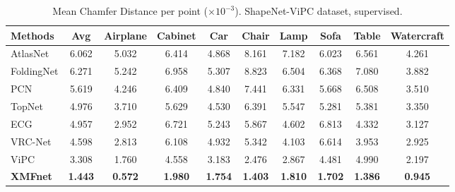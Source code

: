 \documentclass{article}
\begin{document}
\begin{table}
  \caption{Mean Chamfer Distance per point ($\times 10^{-3}$). ShapeNet-ViPC dataset, supervised.}
  \setlength\tabcolsep{4.4pt}
  \label{sup-res}
  \centering
  \begin{tabular}{lccccccccc}
\cmidrule(r){1-10}
    Methods & Avg & Airplane & Cabinet & Car & Chair & Lamp & Sofa & Table & Watercraft \\
    \midrule
    \midrule
    AtlasNet \cite{atlas} & 6.062 & 5.032 & 6.414 & 4.868 & 8.161 & 7.182 & 6.023 & 6.561 & 4.261      \\
    FoldingNet \cite{folding}  &  6.271  & 5.242 & 6.958 & 5.307 & 8.823 & 6.504 & 6.368 & 7.080 & 3.882   \\
    PCN \cite{pcn}& 5.619 & 4.246 & 6.409 & 4.840 & 7.441 & 6.331 & 5.668 & 6.508 & 3.510 \\  
    TopNet \cite{topnet}  & 4.976 & 3.710 & 5.629 & 4.530 & 6.391 & 5.547 & 5.281 & 5.381 & 3.350\\
    ECG \cite{ecg} & 4.957 & 2.952 & 6.721 & 5.243 & 5.867 & 4.602 & 6.813 & 4.332 & 3.127\\ 
    VRC-Net \cite{vrc} & 4.598 & 2.813 & 6.108 & 4.932 & 5.342 &  4.103 & 6.614 & 3.953 & 2.925\\
    ViPC \cite{vipc} & 3.308 & 1.760 & 4.558 & 3.183 & 2.476 & 2.867 & 4.481 & 4.990 & 2.197    \\
    \textbf{XMFnet} &\textbf{1.443} &  \textbf{0.572} & \textbf{1.980} & \textbf{1.754} & \textbf{1.403} & \textbf{1.810} & \textbf{1.702} & \textbf{1.386} & \textbf{0.945} \\
    \bottomrule
  \end{tabular}
  
\end{table}
\end{document}
